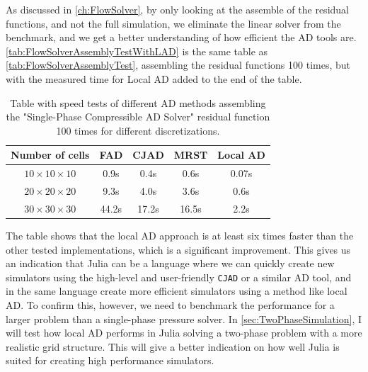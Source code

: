 As discussed in \autoref{ch:FlowSolver}, by only looking at the assemble of the residual functions, and not the full simulation, we eliminate the linear solver from the benchmark, and we get a better understanding of how efficient the AD tools are. \autoref{tab:FlowSolverAssemblyTestWithLAD} is the same table as \autoref{tab:FlowSolverAssemblyTest}, assembling the residual functions 100 times, but with the measured time for Local AD added to the end of the table.
\begin{table}[htb]
    \centering
    \caption{Table with speed tests of different AD methods assembling the "Single-Phase Compressible AD Solver" residual function 100 times for different discretizations.}
    \label{tab:FlowSolverAssemblyTestWithLAD}
    \def\arraystretch{1.5}
    \begin{tabular}{ccccc}
    \textbf{Number of cells} & \textbf{FAD} & \textbf{CJAD} & \textbf{MRST} & \textbf{Local AD}\\
        \hline
         $10\times10\times10$ & 0.9s & 0.4s & 0.6s & 0.07s \\  
         $20\times20\times20$ & 9.3s & 4.0s & 3.6s & 0.6s \\ 
         $30\times30\times30$ & 44.2s& 17.2s& 16.5s & 2.2s \\ \hline
    \end{tabular}
\end{table}
The table shows that the local AD approach is at least six times faster than the other tested implementations, which is a significant improvement. This gives us an indication that Julia can be a language where we can quickly create new simulators using the high-level and user-friendly \texttt{CJAD} or a similar AD tool, and in the same language create more efficient simulators using a method like local AD. To confirm this, however, we need to benchmark the performance for a larger problem than a single-phase pressure solver. In \autoref{sec:TwoPhaseSimulation}, I will test how local AD performs in Julia solving a two-phase problem with a more realistic grid structure. This will give a better indication on how well Julia is suited for creating high performance simulators.


